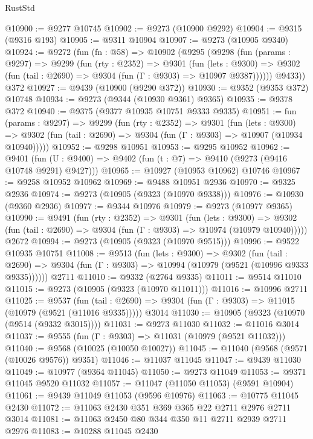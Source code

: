 \begin{lexlean}{RustStd}
\begin{coremodule}
@10900 := @9277 @10745
@10902 := @9273 (@10900 @9292)
@10904 := @9315 (@9316 @193)
@10905 := @9311 @10904
@10907 := @9273 (@10905 @9340)
@10924 := @9272
    (fun (fn : @58) =>
    @10902
      (@9295
        (@9298
          (fun (params : @9297) =>
          @9299
            (fun (rty : @2352) =>
            @9301
              (fun (lets : @9300) =>
              @9302 (fun (tail : @2690) => @9304 (fun (Γ : @9303) => @10907 @9387))))))
        @9433))
    @372
@10927 := @9439 (@10900 (@9290 @372))
@10930 := @9352 (@9353 @372) @10748
@10934 := @9273 (@9344 (@10930 @9361) @9365)
@10935 := @9378 @372
@10940 := @9375 (@9377 @10935 @10751 @9333 @9335)
@10951 := fun (params : @9297) =>
  @9299
    (fun (rty : @2352) =>
    @9301
      (fun (lets : @9300) =>
      @9302 (fun (tail : @2690) => @9304 (fun (Γ : @9303) => @10907 (@10934 @10940)))))
@10952 := @9298 @10951
@10953 := @9295 @10952
@10962 := @9401
    (fun (U : @9400) => @9402 (fun (t : @7) => @9410 (@9273 (@9416 @10748 @9291) @9427)))
@10965 := @10927 (@10953 @10962) @10746
@10967 := @9258 @10952 @10962
@10969 := @9488 @10951 @2936
@10970 := @9325 @2936
@10974 := @9273 (@10905 (@9323 (@10970 @9338)))
@10976 := @10930 (@9360 @2936)
@10977 := @9344 @10976
@10979 := @9273 (@10977 @9365)
@10990 := @9491
    (fun (rty : @2352) =>
    @9301
      (fun (lets : @9300) =>
      @9302 (fun (tail : @2690) => @9304 (fun (Γ : @9303) => @10974 (@10979 @10940)))))
    @2672
@10994 := @9273 (@10905 (@9323 (@10970 @9515)))
@10996 := @9522 @10935 @10751
@11008 := @9513
    (fun (lets : @9300) =>
    @9302
      (fun (tail : @2690) =>
      @9304 (fun (Γ : @9303) => @10994 (@10979 (@9521 (@10996 @9333 @9335))))))
    @2711
@11010 := @9332 (@2764 @9335)
@11011 := @9514 @11010
@11015 := @9273 (@10905 (@9323 (@10970 @11011)))
@11016 := @10996 @2711
@11025 := @9537
    (fun (tail : @2690) => @9304 (fun (Γ : @9303) => @11015 (@10979 (@9521 (@11016 @9335)))))
    @3014
@11030 := @10905 (@9323 (@10970 (@9514 (@9332 @3015))))
@11031 := @9273 @11030
@11032 := @11016 @3014
@11037 := @9555 (fun (Γ : @9303) => @11031 (@10979 (@9521 @11032)))
@11040 := @9568 (@10025 (@10050 @10027))
@11045 := @11040 (@9568 (@9571 (@10026 @9576)) @9351)
@11046 := @11037 @11045
@11047 := @9439 @11030
@11049 := @10977 (@9364 @11045)
@11050 := @9273 @11049
@11053 := @9371 @11045 @9520 @11032
@11057 := @11047 (@11050 @11053) (@9591 @10904)
@11061 := @9439 @11049 @11053 (@9596 @10976)
@11063 := @10775 @11045 @2430
@11072 := @11063 @2430 @351 @369 @365 @22 @2711 @2976 @2711 @3014
@11081 := @11063 @2450 @80 @344 @350 @11 @2711 @2939 @2711 @2976
@11083 := @10288 @11045 @2430

\end{coremodule}
\end{lexlean}
